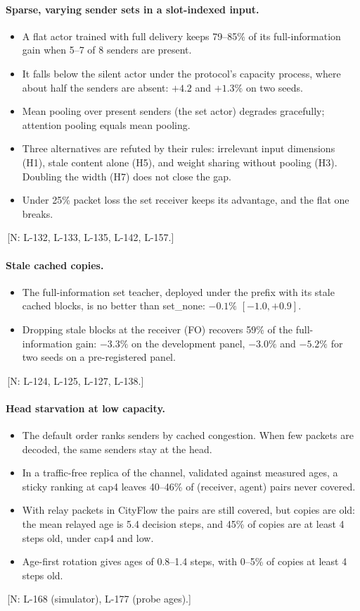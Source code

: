 \documentclass[11pt]{article}
\theoremstyle{definition}
\newif\ifshownotes\shownotestrue
\newcommand{\NOTE}[1]{\ifshownotes{\color{notecol}\,\textsf{\footnotesize[N: #1]}}\fi}
\begin{document}
\paragraph{Sparse, varying sender sets in a slot-indexed input.}
\begin{itemize}
\item A flat actor trained with full delivery keeps 79--85\% of its full-information gain when 5--7 of 8 senders are
present.
\item It falls below the silent actor under the protocol's capacity process, where about half the senders are absent:
$+4.2$ and $+1.3\%$ on two seeds.
\item Mean pooling over present senders (the set actor) degrades gracefully; attention pooling equals mean pooling.
\item Three alternatives are refuted by their rules: irrelevant input dimensions (H1), stale content alone (H5), and
weight sharing without pooling (H3). Doubling the width (H7) does not close the gap.
\item Under 25\% packet loss the set receiver keeps its advantage, and the flat one breaks.
\end{itemize}
\NOTE{L-132, L-133, L-135, L-142, L-157.}
\paragraph{Stale cached copies.}
\begin{itemize}
\item The full-information set teacher, deployed under the prefix with its stale cached blocks, is no better than
set\_none: $-0.1\%$ $[-1.0,+0.9]$.
\item Dropping stale blocks at the receiver (FO) recovers 59\% of the full-information gain: $-3.3\%$ on the development
panel, $-3.0\%$ and $-5.2\%$ for two seeds on a pre-registered panel.
\end{itemize}
\NOTE{L-124, L-125, L-127, L-138.}
\paragraph{Head starvation at low capacity.}
\begin{itemize}
\item The default order ranks senders by cached congestion. When few packets are decoded, the same senders stay at the
head.
\item In a traffic-free replica of the channel, validated against measured ages, a sticky ranking at cap4 leaves 40--46\%
of (receiver, agent) pairs never covered.
\item With relay packets in CityFlow the pairs are still covered, but copies are old: the mean relayed age is 5.4 decision
steps, and 45\% of copies are at least 4 steps old, under cap4 and low.
\item Age-first rotation gives ages of 0.8--1.4 steps, with 0--5\% of copies at least 4 steps old.
\end{itemize}
\NOTE{L-168 (simulator), L-177 (probe ages).}
\end{document}
